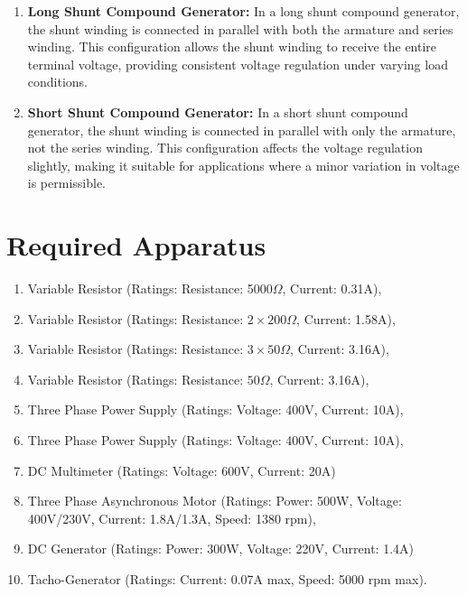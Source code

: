 \documentclass[a4paper,12pt]{article}
\begin{document}
	
	\begin{enumerate}
	\item  \textbf{Long Shunt Compound Generator:}
	In a long shunt compound generator, the shunt winding is connected in parallel with both the armature and series winding. This configuration allows the shunt winding to receive the entire terminal voltage, providing consistent voltage regulation under varying load conditions.
	
	\item  \textbf{Short Shunt Compound Generator:}
	In a short shunt compound generator, the shunt winding is connected in parallel with only the armature, not the series winding. This configuration affects the voltage regulation slightly, making it suitable for applications where a minor variation in voltage is permissible.
	
	\end{enumerate}


	

\newpage
	
	
	
	
	\section{Required Apparatus}
	\begin{enumerate}
		\item Variable Resistor (Ratings: Resistance: 5000$\Omega$, Current: 0.31A),
		\item Variable Resistor (Ratings: Resistance: $2\times 200$$\Omega$, Current: 1.58A),
		\item Variable Resistor (Ratings: Resistance: $3\times50\Omega$, Current: 3.16A),
		\item Variable Resistor (Ratings: Resistance: $50\Omega$, Current: 3.16A),
		\item Three Phase Power Supply (Ratings: Voltage: 400V, Current: 10A),
		\item Three Phase Power Supply (Ratings: Voltage: 400V, Current: 10A),	
		\item DC Multimeter (Ratings: Voltage: 600V, Current: 20A) 
		\item Three Phase Asynchronous Motor (Ratings: Power: 500W, Voltage: 400V/230V, Current: 1.8A/1.3A, Speed: 1380 rpm),
		\item DC Generator (Ratings: Power: 300W, Voltage: 220V, Current: 1.4A)
		\item Tacho-Generator (Ratings: Current: 0.07A max, Speed: 5000 rpm max).
	\end{enumerate}
\end{document}
